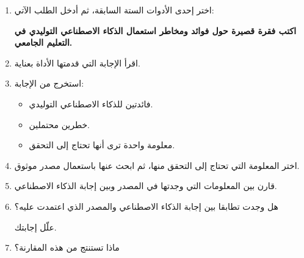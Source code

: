 \documentclass[a4paper]{article}
\begin{document}
\begin{enumerate}


\item اختر إحدى الأدوات الستة السابقة، ثم أدخل الطلب الآتي:

\begin{center}

\textbf{
اكتب فقرة قصيرة حول فوائد ومخاطر استعمال الذكاء الاصطناعي
التوليدي في التعليم الجامعي.
}

\end{center}


\item اقرأ الإجابة التي قدمتها الأداة بعناية.


\item استخرج من الإجابة:

\begin{itemize}

    \item فائدتين للذكاء الاصطناعي التوليدي.

    \item خطرين محتملين.

    \item معلومة واحدة ترى أنها تحتاج إلى التحقق.

\end{itemize}


\item اختر المعلومة التي تحتاج إلى التحقق منها،
ثم ابحث عنها باستعمال مصدر موثوق.


\item قارن بين المعلومات التي وجدتها في المصدر
وبين إجابة الذكاء الاصطناعي.


\item هل وجدت تطابقا بين إجابة الذكاء الاصطناعي
والمصدر الذي اعتمدت عليه؟

علّل إجابتك.


\item ماذا تستنتج من هذه المقارنة؟


\end{enumerate}
\end{document}
